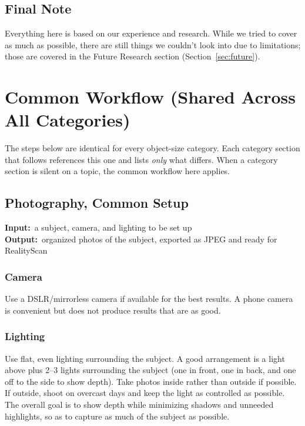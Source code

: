 \documentclass[11pt]{article}
\newcommand{\inout}[2]{%
    \begin{stageio}%
    \textbf{Input:}~#1\\[2pt]%
    \textbf{Output:}~#2%
    \end{stageio}%
}
\begin{document}
\subsection*{Final Note}
Everything here is based on our experience and research. While we tried to cover as much as possible, there are still things we couldn't look into due to limitations; those are covered in the Future Research section (Section~\ref{sec:future}).

\section{Common Workflow (Shared Across All Categories)}
\label{sec:common}
The steps below are identical for every object-size category. Each category section that follows references this one and lists \emph{only} what differs. When a category section is silent on a topic, the common workflow here applies.

\subsection{Photography, Common Setup}
\label{sec:common-photo}
\inout{a subject, camera, and lighting to be set up}{organized photos of the subject, exported as JPEG and ready for RealityScan}

\subsubsection{Camera}
Use a DSLR/mirrorless camera if available for the best results. A phone camera is convenient but does not produce results that are as good.

\subsubsection{Lighting}
Use flat, even lighting surrounding the subject. A good arrangement is a light above plus 2--3 lights surrounding the subject (one in front, one in back, and one off to the side to show depth). Take photos inside rather than outside if possible. If outside, shoot on overcast days and keep the light as controlled as possible. The overall goal is to show depth while minimizing shadows and unneeded highlights, so as to capture as much of the subject as possible.
\end{document}
